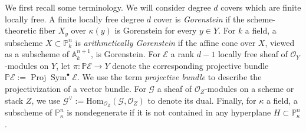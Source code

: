 \documentclass[12 pt]{amsart}
\newcommand{\rboxed}[1]{#1}
\theoremstyle{plain}
\theoremstyle{definition}
\newtheorem{remark}[theorem]{Remark}
\theoremstyle{remark}
\numberwithin{equation}{section}
\newcommand\bp{\mathbb P}
\newcommand\sce{\mathscr E}
\newcommand\scg{\mathscr G}
\newcommand\sco{\mathscr O}
\newcommand \ra{\rightarrow}
\DeclareMathOperator\proj{\operatorname{Proj}}
\renewcommand\hom{\mathrm{Hom}}
\DeclareMathOperator\sym{Sym}
\begin{document}
We first recall some terminology.
We will consider degree $d$ covers which are finite locally free.
A finite locally free degree $d$ cover is {\em Gorenstein} if the scheme-theoretic fiber $X_y$ over
$\kappa(y)$  is Gorenstein for every $y \in Y$.  For $k$ a field,  a
subscheme $X \subset \bp^n_k$ is {\em arithmetically Gorenstein} if the affine
cone over $X$, viewed as a subscheme of $\mathbb A^{n+1}_k$, is Gorenstein.
For $\sce$ a rank $d-1$  locally free sheaf of $\mathscr O_Y$-modules on $Y$,
let $\rboxed{\pi: \bp \sce \ra Y}$ denote the corresponding projective
bundle $\rboxed{\bp \sce} := \proj \sym^\bullet \sce$.  
We use the term {\em projective bundle} to describe the projectivization of a vector
bundle.
For $\scg$ a sheaf of $\mathscr O_Z$-modules on a scheme or stack $Z$, we use $\scg^\vee := \hom_{\mathscr O_Z}(\scg,
\sco_Z)$ to denote its dual.
Finally, for $\kappa$ a field, a subscheme of $\bp^n_\kappa$ is nondegenerate if it is not contained in any
hyperplane $H \subset \bp^n_\kappa$.
\end{document}
